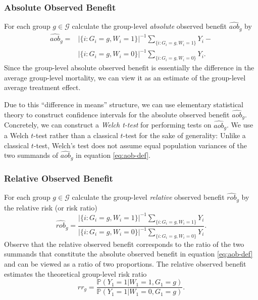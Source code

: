 \documentclass[11pt]{article}
\begin{document}
\subsubsection{Absolute Observed Benefit}
For each group $g \in \mathcal{G}$ calculate the group-level \textit{absolute} observed benefit $\widehat{aob}_g$ by
\begin{equation}
\begin{split}
    \widehat{aob}_g = &|\{ i : G_i = g, W_i = 1\}|^{-1} \sum_{\{ i : G_i = g, W_i = 1 \}} Y_i
    - \\
    &|\{ i : G_i = g, W_i = 0\}|^{-1} \sum_{\{ i : G_i = g, W_i = 0 \}} Y_i.
\end{split}
\label{eq:aob-def}
\end{equation}
Since the group-level absolute observed benefit is essentially the difference in the average group-level mortality, we can view it as an estimate of the group-level average treatment effect.

Due to this ``difference in means'' structure, we can use elementary statistical theory to construct confidence intervals for the absolute observed benefit $\widehat{aob}_g$. Concretely, we can construct a \textit{Welch t-test} for performing tests on $\widehat{aob}_g$. We use a Welch $t$-test rather than a classical $t$-test for the sake of generality: Unlike a classical $t$-test, Welch's test does not assume equal population variances of the two summands of $\widehat{aob}_g$ in equation \eqref{eq:aob-def}.

\subsubsection{Relative Observed Benefit}
For each group $g \in \mathcal{G}$ calculate the group-level \textit{relative} observed benefit $\widehat{rob}_g$ by the relative risk (or risk ratio)
\begin{equation}
    \widehat{rob}_g = \frac{|\{ i : G_i = g, W_i = 1\}|^{-1} \sum_{\{ i : G_i = g, W_i = 1 \}} Y_i
    }{|\{ i : G_i = g, W_i = 0\}|^{-1} \sum_{\{ i : G_i = g, W_i = 0 \}} Y_i}.
\label{eq:rob-def}
\end{equation}
Observe that the relative observed benefit corresponds to the ratio of the two summands that constitute the absolute observed benefit in equation \eqref{eq:aob-def} and can be viewed as a ratio of two proportions. The relative observed benefit estimates the theoretical group-level risk ratio
\begin{equation}
    rr_g = \frac{\mathbb{P}(Y_1 = 1 | W_1 = 1, G_1 = g)}{\mathbb{P}(Y_1 = 1 | W_1 = 0, G_1 = g)}.
\label{eq:rr_g}
\end{equation}
\end{document}
